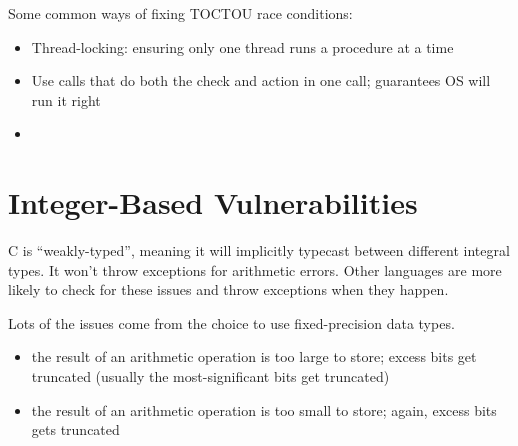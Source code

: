 

Some common ways of fixing TOCTOU race conditions:
\begin{itemize}
    \item Thread-locking: ensuring only one thread runs a procedure at a time
    \item Use calls that do both the check and action in one call; guarantees OS will run it right
    \item {}
\end{itemize}

\section{Integer-Based Vulnerabilities}

C is ``weakly-typed'', meaning it will implicitly typecast between different integral types. It won't throw exceptions for arithmetic errors. Other languages are more likely to check for these issues and throw exceptions when they happen.

Lots of the issues come from the choice to use fixed-precision data types.
\begin{itemize}
    \item {} the result of an arithmetic operation is too large to store; excess bits get truncated (usually the most-significant bits get truncated)
    \item {} the result of an arithmetic operation is too small to store; again, excess bits gets truncated
\end{itemize}

